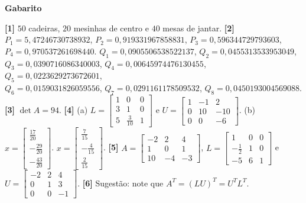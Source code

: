 \documentclass[11pt,a4paper]{article}
\begin{document}
\begin{center}
\textbf{Gabarito}
\end{center} 
\textbf{[1]} $50$ cadeiras, $20$ mesinhas de centro e $40$ mesas de jantar. 
\textbf{[2]} $P_1 = 5,47246730738932$, $P_2 = 0,919331967858831$, $P_3 = 0,596344729793603$, $P_4 = 0,970537261698440$. 
$Q_1 = 0,0905506538522137$, $Q_2 = 0,0455313533953049$, $Q_3 = 0,0390716086340003$, $Q_4 = 0,00645974476130455$, 
$Q_5 = 0,0223629273672601$, \\ $Q_6 = 0,0159031826059556$, $Q_7 = 0,0291161178509532$, $Q_8 = 0,0450193004569088$.
\textbf{[3]} $\det A = 94$.
\textbf{[4]} (a) $L = \begin{bmatrix}1 & 0 & 0 \\ 3 & 1 & 0 \\ 5 & \frac{3}{10} & 1\end{bmatrix}$ e 
$U = \begin{bmatrix} 1 & -1 & 2 \\ 0 & 10 & -10 \\ 0 & 0 & -6 \end{bmatrix}$. 
(b) $x = 
\begin{bmatrix}
\frac{17}{20} \\
-\frac{29}{20} \\
-\frac{43}{20}
\end{bmatrix}
$. 
$x = 
\begin{bmatrix}
\frac{7}{15} \\
-\frac{4}{15} \\
\frac{2}{15}
\end{bmatrix}
$. 
\textbf{[5]} $A = \begin{bmatrix}-2 & 2 & 4 \\ 1 & 0 & 1\\ 10 & -4 & -3\end{bmatrix}$, 
$L = \begin{bmatrix}1 & 0 & 0 \\ -\frac{1}{2} & 1 & 0 \\ -5 & 6 & 1\end{bmatrix}$ e  
$U = \begin{bmatrix}-2 & 2 & 4 \\ 0 & 1 & 3 \\ 0 & 0 & -1\end{bmatrix}$. 
\textbf{[6]} Sugestão: note que $A^T = (LU)^T = U^TL^T$.
\end{document}
